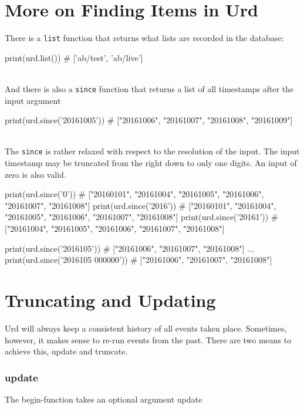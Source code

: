 \newpage
\section{More on Finding Items in Urd}
There is a \texttt{list} function that returns what lists are recorded
in the database:
\\
\begin{pythonBEG}
  print(urd.list())
  # ['ab/test', 'ab/live']
\end{pythonBEG}
\\
And there is also a \texttt{since} function that returns a list of all
timestamps after the input argument
\\
\begin{pythonMID}
  print(urd.since('20161005'))
  # ["20161006", "20161007", "20161008", "20161009"]
\end{pythonMID}
\\
The \texttt{since} is rather relaxed with respect to the resolution of
the input.  The input timestamp may be truncated from the right down
to only one digits.  An input of zero is also valid.
\\
\begin{pythonEND}
  print(urd.since('0'))
  # ["20160101", "20161004", "20161005", "20161006", "20161007", "20161008"]
  print(urd.since('2016'))
  # ["20160101", "20161004", "20161005", "20161006", "20161007", "20161008"]
  print(urd.since('20161'))
  # ["20161004", "20161005", "20161006", "20161007", "20161008"]

  print(urd.since('2016105'))
  # ["20161006", "20161007", "20161008"]
  ...
  print(urd.since('2016105 000000'))
  # ["20161006", "20161007", "20161008"]
\end{pythonEND}



\section{Truncating and Updating}

Urd will always keep a consistent history of all events taken place.
Sometimes, however, it makes sense to re-run events from the past.
There are two means to achieve this, update and truncate.

\subsubsection{update}
The begin-function takes an optional argument update

